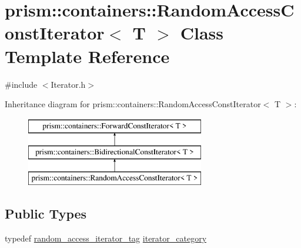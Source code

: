 \hypertarget{classprism_1_1containers_1_1_random_access_const_iterator}{}\section{prism\+:\+:containers\+:\+:Random\+Access\+Const\+Iterator$<$ T $>$ Class Template Reference}
\label{classprism_1_1containers_1_1_random_access_const_iterator}


{\ttfamily \#include $<$Iterator.\+h$>$}

Inheritance diagram for prism\+:\+:containers\+:\+:Random\+Access\+Const\+Iterator$<$ T $>$\+:\begin{figure}[H]
\begin{center}
\leavevmode
\includegraphics[height=3.000000cm]{classprism_1_1containers_1_1_random_access_const_iterator}
\end{center}
\end{figure}
\subsection*{Public Types}
\begin{DoxyCompactItemize}
\item 
typedef \hyperlink{structprism_1_1containers_1_1random__access__iterator__tag}{random\+\_\+access\+\_\+iterator\+\_\+tag} \hyperlink{classprism_1_1containers_1_1_random_access_const_iterator_a4e982b161e1d5c5788c7a1de8ef930d2}{iterator\+\_\+category}
\end{DoxyCompactItemize}

